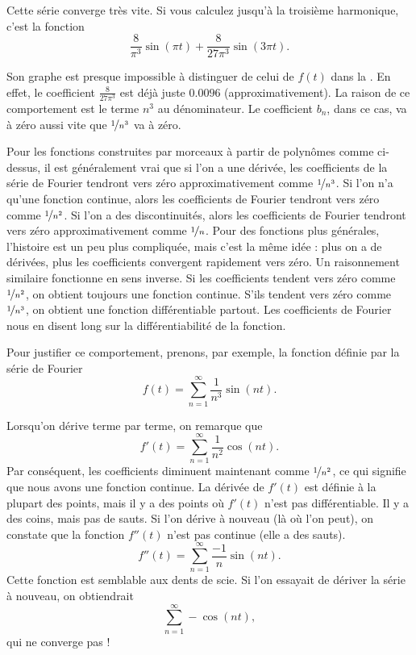 \begin{example}
Cette série converge très vite. Si vous calculez jusqu'à la troisième harmonique, c'est la fonction
\begin{equation*}
\frac{8}{\pi^3} \sin (\pi t) + 
\frac{8}{27 \pi^3} \sin (3 \pi t).
\end{equation*}

Son graphe est presque impossible à distinguer de celui de $f(t)$ dans la 
.
En effet, le coefficient
$\frac{8}{27 \pi^3}$ est déjà juste $0.0096$ (approximativement).
La raison de ce comportement est le terme $n^3$ au dénominateur.
Le coefficient $b_n$, dans ce cas, va à zéro aussi vite que
$\nicefrac{1}{n^3}$ va à zéro.
\end{example}

Pour les fonctions construites par morceaux à partir de polynômes comme ci-dessus,
il est généralement vrai que si l'on a une dérivée, les coefficients de la série de Fourier
tendront vers zéro approximativement comme $\nicefrac{1}{n^3}$. Si l'on n'a qu'une fonction continue, alors les coefficients de Fourier tendront vers zéro comme $\nicefrac{1}{n^2}$.  Si l'on a des discontinuités, alors
les coefficients de Fourier tendront vers zéro approximativement comme $\nicefrac{1}{n}$.
Pour des fonctions plus générales, l'histoire est un peu plus compliquée, mais c'est la
même idée : plus on a de dérivées, plus les coefficients convergent rapidement vers zéro. Un raisonnement similaire fonctionne en sens inverse. Si les coefficients tendent vers 
zéro comme $\nicefrac{1}{n^2}$, on obtient toujours une fonction continue. S'ils tendent vers zéro comme $\nicefrac{1}{n^3}$, 
on obtient une fonction différentiable partout.  Les coefficients de Fourier nous en disent long sur la différentiabilité de la fonction. 

Pour justifier ce comportement, prenons, par exemple, la fonction définie par
la série de Fourier
\begin{equation*}
f(t) = \sum_{n=1}^\infty \frac{1}{n^3} \sin (n t) .
\end{equation*}

Lorsqu'on dérive terme par terme, on remarque que
\begin{equation*}
f'(t) = \sum_{n=1}^\infty \frac{1}{n^2} \cos (n t) .
\end{equation*}
Par conséquent, les coefficients diminuent maintenant comme $\nicefrac{1}{n^2}$, ce qui 
signifie que nous avons une fonction continue.
La dérivée de $f'(t)$ est définie à la plupart des points, mais il y a des points où $f'(t)$ n'est pas différentiable.
Il y a des coins, mais pas de sauts.
Si l'on dérive à nouveau (là où l'on peut), on constate que la fonction
$f''(t)$ n'est pas continue (elle a des sauts).
\begin{equation*}
f''(t) = \sum_{n=1}^\infty \frac{-1}{n} \sin (n t) .
\end{equation*}
Cette fonction est semblable aux dents de scie. Si l'on essayait de dériver 
la série à nouveau, on obtiendrait
\begin{equation*}
\sum_{n=1}^\infty -\cos (n t) ,
\end{equation*}
qui ne converge pas !

